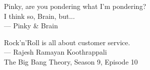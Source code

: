 \thispagestyle{empty}
{}

\vspace*{3cm}

\begin{center}
Pinky, are you pondering what I'm pondering? \\
\smallskip
I think so, Brain, but...
\\ \medskip
    --- Pinky \& Brain
\end{center}

\begin{center}
Rock'n'Roll is all about customer service.
\\ \medskip
    --- Rajesh Ramayan Koothrappali \\
    The Big Bang Theory, Season 9, Episode 10
\end{center}

